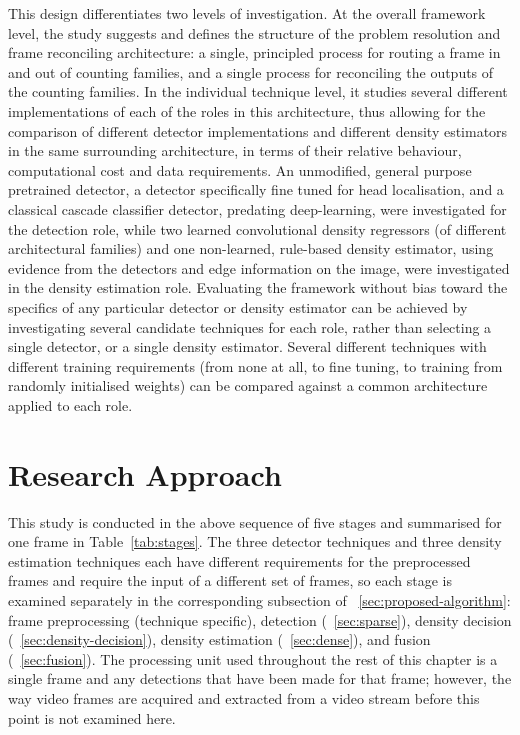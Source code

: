 This design differentiates two levels of investigation. At the overall framework level, the study suggests and defines the structure of the problem resolution and frame reconciling architecture: a single, principled process for routing a frame in and out of counting families, and a single process for reconciling the outputs of the counting families. In the individual technique level, it studies several different implementations of each of the roles in this architecture, thus allowing for the comparison of different detector implementations and different density estimators in the same surrounding architecture, in terms of their relative behaviour, computational cost and data requirements. An unmodified, general purpose pretrained detector, a detector specifically fine tuned for head localisation, and a classical cascade classifier detector, predating deep-learning, were investigated for the detection role, while two learned convolutional density regressors (of different architectural families) and one non-learned, rule-based density estimator, using evidence from the detectors and edge information on the image, were investigated in the density estimation role. Evaluating the framework without bias toward the specifics of any particular detector or density estimator can be achieved by investigating several candidate techniques for each role, rather than selecting a single detector, or a single density estimator. Several different techniques with different training requirements (from none at all, to fine tuning, to training from randomly initialised weights) can be compared against a common architecture applied to each role.

\section{Research Approach}

This study is conducted in the above sequence of five stages and summarised for one frame in Table~\ref{tab:stages}. The three detector techniques and three density estimation techniques each have different requirements for the preprocessed frames and require the input of a different set of frames, so each stage is examined separately in the corresponding subsection of ~\cref{sec:proposed-algorithm}: frame preprocessing (technique specific), detection (~\cref{sec:sparse}), density decision (~\cref{sec:density-decision}), density estimation (~\cref{sec:dense}), and fusion (~\cref{sec:fusion}). The processing unit used throughout the rest of this chapter is a single frame and any detections that have been made for that frame; however, the way video frames are acquired and extracted from a video stream before this point is not examined here.

